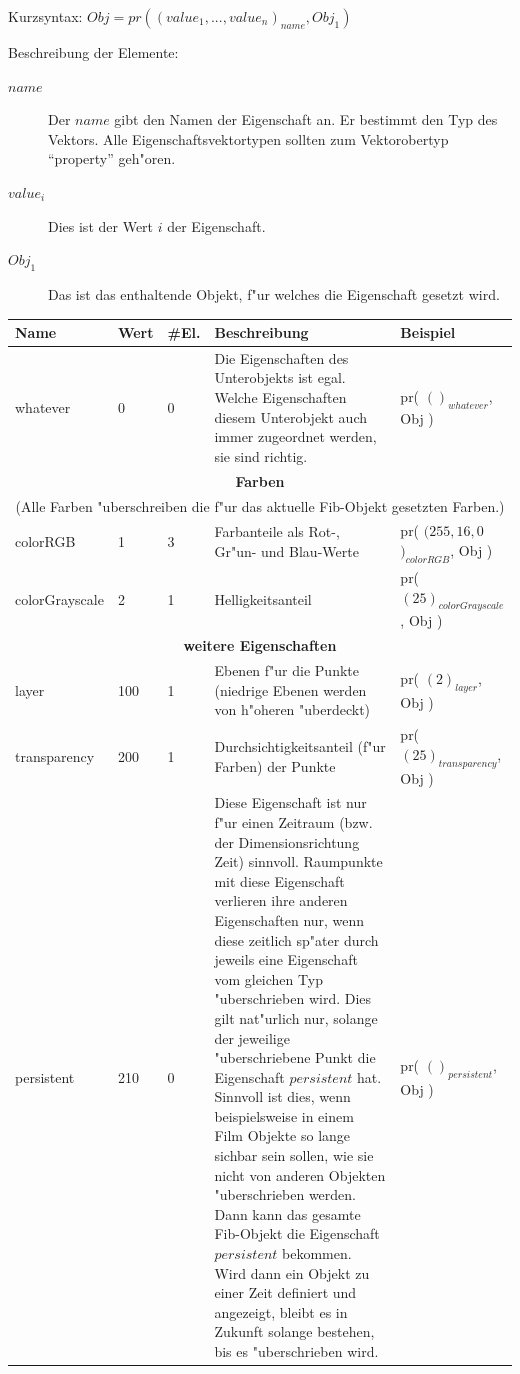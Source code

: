 \bigskip\noindent
Kurzsyntax:
$Obj = pr( (value_1, ..., value_n)_{name}, Obj_1 )$

\bigskip\noindent
Beschreibung der Elemente:
\begin{description}
 \item[$name$] Der $name$ gibt den Namen der Eigenschaft an. Er bestimmt den Typ des Vektors. Alle Eigenschaftsvektortypen sollten zum Vektorobertyp ``property'' geh"oren.
 \item[$value_i$] Dies ist der Wert $i$ der Eigenschaft.
 \item[$Obj_1$] Das ist das enthaltende Objekt, f"ur welches die Eigenschaft gesetzt wird.
\end{description}


\begin{small}
\begin{center}
\begin{longtable}{|p{22mm}|p{6mm}|p{5mm}|p{50mm}|p{30mm}|}\hline
	\textbf{Name} & \textbf{Wert} & \textbf{\#El.} & \textbf{Beschreibung} & \textbf{Beispiel} \\\hline\endhead
	whatever & 0 & 0 & Die Eigenschaften des Unterobjekts ist egal. Welche Eigenschaften diesem Unterobjekt auch immer zugeordnet werden, sie sind richtig. & pr( $()_{whatever}$, Obj )\\\hline
	\multicolumn{5}{|c|}{\textbf{Farben}}\\
	\multicolumn{5}{|c|}{(Alle Farben "uberschreiben die f"ur das aktuelle Fib-Objekt gesetzten Farben.)}\\\hline
	colorRGB & 1 & 3 & Farbanteile als Rot-, Gr"un- und Blau-Werte & pr( $(255, 16, 0$ $)_{colorRGB}$, Obj )\\\hline
	colorGrayscale & 2 & 1 & Helligkeitsanteil & pr( $(25)_{colorGrayscale}$, Obj )\\\hline

	\multicolumn{5}{|c|}{\textbf{weitere Eigenschaften}}\\\hline
	layer & 100 & 1 & Ebenen f"ur die Punkte (niedrige Ebenen werden von h"oheren "uberdeckt) & pr( $(2)_{layer}$, Obj )\\\hline
	transparency & 200 & 1 & Durchsichtigkeitsanteil (f"ur Farben) der Punkte & pr( $(25)_{transparency}$, Obj ) \\\hline
	persistent & 210 & 0 & Diese Eigenschaft ist nur f"ur einen Zeitraum (bzw. der Dimensionsrichtung Zeit) sinnvoll. Raumpunkte mit diese Eigenschaft verlieren ihre anderen Eigenschaften nur, wenn diese zeitlich sp"ater durch jeweils eine Eigenschaft vom gleichen Typ "uberschrieben wird. Dies gilt nat"urlich nur, solange der jeweilige "uberschriebene Punkt die Eigenschaft $persistent$ hat. Sinnvoll ist dies, wenn beispielsweise in einem Film Objekte so lange sichbar sein sollen, wie sie nicht von anderen Objekten "uberschrieben werden. Dann kann das gesamte Fib-Objekt die Eigenschaft $persistent$ bekommen. Wird dann ein Objekt zu einer Zeit definiert und angezeigt, bleibt es in Zukunft solange bestehen, bis es "uberschrieben wird. &  pr( $()_{persistent}$, Obj ) \\\hline


\end{longtable}
\end{center}
\end{small}
